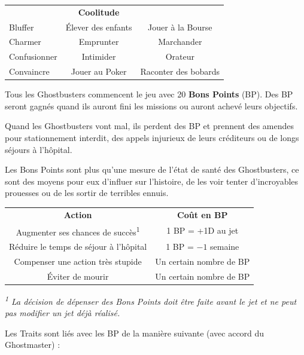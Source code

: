 \begin{frame}[b]
{\begin{center}
\begin{tabular}{>{\centering\arraybackslash}p{2.5cm}cc}
& \textbf{Coolitude} & \\
Bluffer & Élever des enfants & Jouer à la Bourse \\
Charmer & Emprunter & Marchander \\
Confusionner & Intimider & Orateur \\
Convaincre & Jouer au Poker & Raconter des bobards \\
\end{tabular}
\end{center}


\myindent Tous les Ghostbusters commencent le jeu avec 20 \textbf{Bons Points} (BP). Des BP seront gagnés quand ils auront fini les missions ou auront achevé leurs objectifs.

\myindent Quand les Ghostbusters vont mal, ils perdent des BP et prennent des amendes pour stationnement interdit, des appels injurieux de leurs créditeurs ou de longs séjours à l'hôpital.

\myindent Les Bons Points sont plus qu'une mesure de l'état de santé des Ghostbusters, ce sont des moyens pour eux d'influer sur l'histoire, de les voir tenter d'incroyables prouesses ou de les sortir de terribles ennuis.

\begin{center}
\begin{tabular}{cc}
\textbf{Action} & \textbf{Coût en BP}\\
Augmenter ses chances de succès\textsuperscript{1} & 1 BP = +1D au jet \\
Réduire le temps de séjour à l'hôpital & 1 BP = $-1$ semaine \\
Compenser une action très stupide & Un certain nombre de BP \\
Éviter de mourir & Un certain nombre de BP \\
\end{tabular}
\end{center}

{\small \textit{\textsuperscript{1} La décision de dépenser des Bons Points doit être faite avant le jet et ne peut pas modifier un jet déjà réalisé.}}


\myindent Les Traits sont liés avec les BP de la manière suivante (avec accord du Ghostmaster) :

}
\end{frame}
